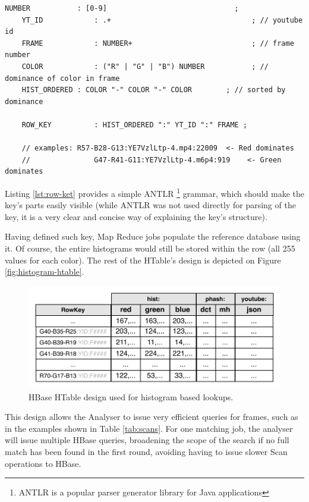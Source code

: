 \begin{lstlisting}[caption={Grammar for the Histogram RowKey. In essence, it contains an encoded colour dominance value, the youtube id of the movie, and frame number.}, label={lst:row-key}]
    NUMBER           : [0-9]                              ;
    YT_ID            : .+                                 ; // youtube id
    FRAME            : NUMBER+                            ; // frame number
    COLOR            : ("R" | "G" | "B") NUMBER           ; // dominance of color in frame
    HIST_ORDERED : COLOR "-" COLOR "-" COLOR        ; // sorted by dominance

    ROW_KEY          : HIST_ORDERED ":" YT_ID ":" FRAME ;
    
    // examples: R57-B28-G13:YE7VzlLtp-4.mp4:22009  <- Red dominates
    //               G47-R41-G11:YE7VzlLtp-4.m6p4:919    <- Green dominates
\end{lstlisting}

Listing \ref{lst:row-ket} provides a simple ANTLR \footnote{ANTLR is a popular parser generator library for Java applications} grammar, which should make the key's parts easily visible (while ANTLR was not used directly for parsing of the key, it is a very clear and concise way of explaining the key's structure).

Having defined such key, Map Reduce jobs populate the reference database using it. Of course, the entire histograms would still be stored within the row (all 255 values for each color). The rest of the HTable's design is depicted on Figure \ref{fig:histogram-htable}.

\begin{figure}[ch!]
  \centering
  \includegraphics[width=\textwidth]{img/hbase-hashes-table}
  \caption{HBase HTable design used for histogram based lookups.}
  \label{fig:histogram-table}
\end{figure}

This design allows the Analyser to issue very efficient queries for frames, such as in the examples shown in Table \ref{tab:scans}. For one matching job, the analyser will issue multiple HBase queries, broadening the scope of the search if no full match has been found in the first round, avoiding having to issue slower Scan operations to HBase.

